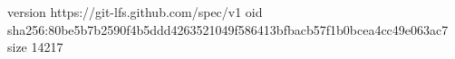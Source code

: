 version https://git-lfs.github.com/spec/v1
oid sha256:80be5b7b2590f4b5ddd4263521049f586413bfbacb57f1b0bcea4cc49e063ac7
size 14217
